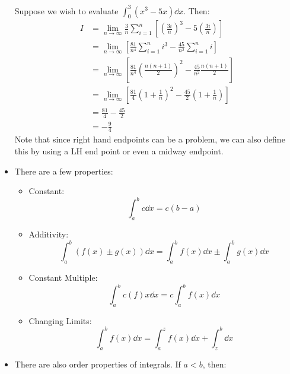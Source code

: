 \begin{itemize}
\begin{equation}
    \end{equation}
    \begin{example}
        Suppose we wish to evaluate $\int_0^3 (x^3-5x) \dd{x}$. Then:
        \begin{align}
            I &= \lim_{n\to\infty} \frac{3}{n} \sum_{i=1}^n \left[\left(\frac{3i}{n}\right)^3-5\left(\frac{3i}{n}\right)\right] \\ 
            &= \lim_{n\to \infty} \left[\frac{81}{n^4}\sum_{i=1}^n i^3 - \frac{45}{n^2}\sum_{i=1}^n i\right] \\ 
            &= \lim_{n\to \infty}\left[\frac{81}{n^4}\left(\frac{n(n+1)}{2}\right)^2-\frac{45}{n^2}\frac{n(n+1)}{2}\right] \\ 
            &= \lim_{n\to\infty} \left[\frac{81}{4}\left(1+\frac{1}{n}\right)^2-\frac{45}{2}\left(1+\frac{1}{n}\right)\right] \\ 
            &= \frac{81}{4}-\frac{45}{2} \\ 
            &= -\frac{9}{4}
        \end{align}
        Note that since right hand endpoints can be a problem, we can also define this by using a LH end point or even a midway endpoint.
    \end{example}
    \item There are a few properties:
\begin{itemize}
    \item Constant:    \begin{equation}
        \int_a^b c\dd{x} = c(b-a)
        \label{eq:}
    \end{equation}
    \item Additivity: \begin{equation}
        \int_a^b \left(f(x) \pm g(x)\right) \dd{x} = \int_a^b f(x)\dd{x} \pm \int_a^b g(x)\dd{x}
    \end{equation}
    \item Constant Multiple:
    \begin{equation}
        \int_a^b c(f)x \dd{x} = c\int_a^b f(x)\dd{x}
    \end{equation}
    \item Changing Limits:
    \begin{equation}
        \int_a^b f(x) \dd{x} = \int_a^zf(x)\dd{x} + \int_z^b\dd{x}
    \end{equation}
\end{itemize}
\item There are also order properties of integrals. If $a<b$, then:
\begin{itemize}

\end{itemize}
\end{itemize}

